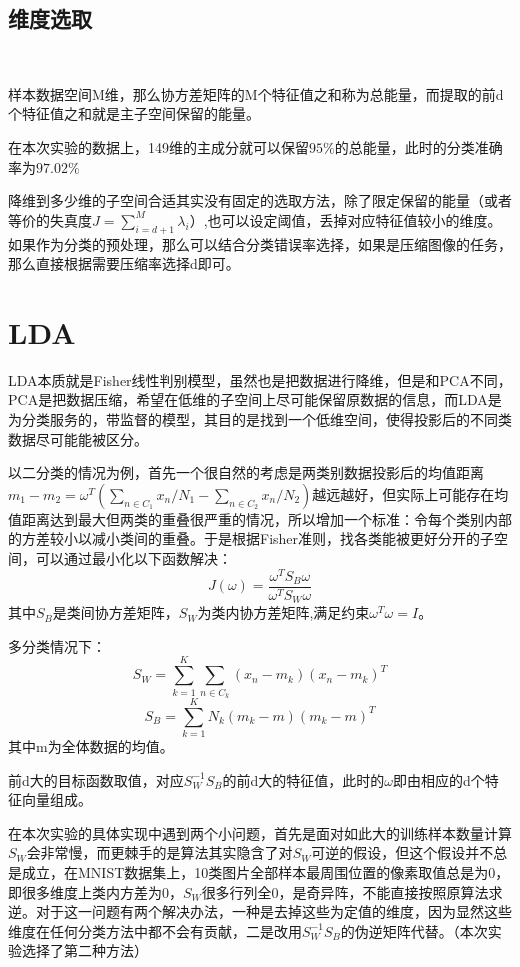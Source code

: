 \documentclass[hyperref,UTF8]{ctexart}
\begin{document}
\subsection*{维度选取}\
\par 样本数据空间M维，那么协方差矩阵的M个特征值之和称为总能量，而提取的前d个特征值之和就是主子空间保留的能量。
\par 在本次实验的数据上，149维的主成分就可以保留$95\%$的总能量，此时的分类准确率为$97.02\%$
\par 降维到多少维的子空间合适其实没有固定的选取方法，除了限定保留的能量（或者等价的失真度$J=\sum_{i=d+1}^{M}\lambda_i$）,也可以设定阈值，丢掉对应特征值较小的维度。如果作为分类的预处理，那么可以结合分类错误率选择，如果是压缩图像的任务，那么直接根据需要压缩率选择d即可。



\section*{LDA}
\par LDA本质就是Fisher线性判别模型，虽然也是把数据进行降维，但是和PCA不同，PCA是把数据压缩，希望在低维的子空间上尽可能保留原数据的信息，而LDA是为分类服务的，带监督的模型，其目的是找到一个低维空间，使得投影后的不同类数据尽可能能被区分。
\par 以二分类的情况为例，首先一个很自然的考虑是两类别数据投影后的均值距离$m_1-m_2=\omega^T(\sum_{n\in C_1}x_n/N_1-\sum_{n\in C_2}x_n/N_2)$越远越好，但实际上可能存在均值距离达到最大但两类的重叠很严重的情况，所以增加一个标准：令每个类别内部的方差较小以减小类间的重叠。于是根据Fisher准则，找各类能被更好分开的子空间，可以通过最小化以下函数解决：
\[J(\omega)=\frac{\omega^T S_B \omega}{\omega^T S_W \omega}\]
其中$S_B$是类间协方差矩阵，$S_W$为类内协方差矩阵,满足约束$\omega^T\omega=I$。
\par 多分类情况下：
\[S_W = \sum_{k=1}^{K}\sum_{n\in C_k}(x_n-m_k)(x_n-m_k)^T\]
\[S_B=\sum_{k=1}^{K}N_k(m_k-m)(m_k-m)^T\]
其中m为全体数据的均值。
\par 前d大的目标函数取值，对应$S_{W}^{-1}S_B$的前d大的特征值，此时的$\omega$即由相应的d个特征向量组成。
\par 在本次实验的具体实现中遇到两个小问题，首先是面对如此大的训练样本数量计算$S_W$会非常慢，而更棘手的是算法其实隐含了对$S_W$可逆的假设，但这个假设并不总是成立，在MNIST数据集上，10类图片全部样本最周围位置的像素取值总是为0，即很多维度上类内方差为0，$S_W$很多行列全0，是奇异阵，不能直接按照原算法求逆。对于这一问题有两个解决办法，一种是去掉这些为定值的维度，因为显然这些维度在任何分类方法中都不会有贡献，二是改用$S_{W}^{-1}S_B$的伪逆矩阵代替。（本次实验选择了第二种方法）
\end{document}
